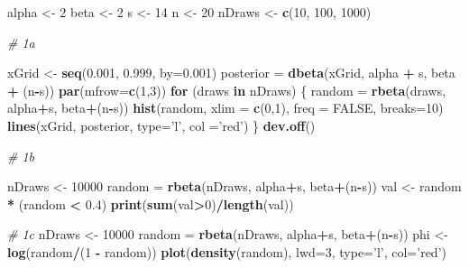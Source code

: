 \documentclass[]{article}
\newenvironment{Shaded}{\begin{snugshade}}{\end{snugshade}}
\newcommand{\KeywordTok}[1]{\textcolor[rgb]{0.13,0.29,0.53}{\textbf{#1}}}
\newcommand{\DataTypeTok}[1]{\textcolor[rgb]{0.13,0.29,0.53}{#1}}
\newcommand{\DecValTok}[1]{\textcolor[rgb]{0.00,0.00,0.81}{#1}}
\newcommand{\FloatTok}[1]{\textcolor[rgb]{0.00,0.00,0.81}{#1}}
\newcommand{\StringTok}[1]{\textcolor[rgb]{0.31,0.60,0.02}{#1}}
\newcommand{\CommentTok}[1]{\textcolor[rgb]{0.56,0.35,0.01}{\textit{#1}}}
\newcommand{\OtherTok}[1]{\textcolor[rgb]{0.56,0.35,0.01}{#1}}
\newcommand{\ControlFlowTok}[1]{\textcolor[rgb]{0.13,0.29,0.53}{\textbf{#1}}}
\newcommand{\OperatorTok}[1]{\textcolor[rgb]{0.81,0.36,0.00}{\textbf{#1}}}
\newcommand{\NormalTok}[1]{#1}
\begin{document}
\begin{Shaded}
\begin{Highlighting}[]
\NormalTok{alpha <-}\StringTok{ }\DecValTok{2}
\NormalTok{beta <-}\StringTok{ }\DecValTok{2}
\NormalTok{s <-}\StringTok{ }\DecValTok{14}
\NormalTok{n <-}\StringTok{ }\DecValTok{20}
\NormalTok{nDraws <-}\StringTok{ }\KeywordTok{c}\NormalTok{(}\DecValTok{10}\NormalTok{, }\DecValTok{100}\NormalTok{, }\DecValTok{1000}\NormalTok{)}

\CommentTok{# 1a}

\NormalTok{xGrid <-}\StringTok{ }\KeywordTok{seq}\NormalTok{(}\FloatTok{0.001}\NormalTok{, }\FloatTok{0.999}\NormalTok{, }\DataTypeTok{by=}\FloatTok{0.001}\NormalTok{)}
\NormalTok{posterior =}\StringTok{ }\KeywordTok{dbeta}\NormalTok{(xGrid, alpha }\OperatorTok{+}\StringTok{ }\NormalTok{s, beta }\OperatorTok{+}\StringTok{ }\NormalTok{(n}\OperatorTok{-}\NormalTok{s))}
\KeywordTok{par}\NormalTok{(}\DataTypeTok{mfrow=}\KeywordTok{c}\NormalTok{(}\DecValTok{1}\NormalTok{,}\DecValTok{3}\NormalTok{))}
\ControlFlowTok{for}\NormalTok{ (draws }\ControlFlowTok{in}\NormalTok{ nDraws) \{}
\NormalTok{  random =}\StringTok{ }\KeywordTok{rbeta}\NormalTok{(draws, alpha}\OperatorTok{+}\NormalTok{s, beta}\OperatorTok{+}\NormalTok{(n}\OperatorTok{-}\NormalTok{s))}
  \KeywordTok{hist}\NormalTok{(random, }\DataTypeTok{xlim =} \KeywordTok{c}\NormalTok{(}\DecValTok{0}\NormalTok{,}\DecValTok{1}\NormalTok{), }\DataTypeTok{freq =} \OtherTok{FALSE}\NormalTok{, }\DataTypeTok{breaks=}\DecValTok{10}\NormalTok{)}
  \KeywordTok{lines}\NormalTok{(xGrid, posterior, }\DataTypeTok{type=}\StringTok{'l'}\NormalTok{, }\DataTypeTok{col =}\StringTok{'red'}\NormalTok{)}
\NormalTok{\}}
\KeywordTok{dev.off}\NormalTok{() }

\CommentTok{# 1b}

\NormalTok{nDraws <-}\StringTok{ }\DecValTok{10000}
\NormalTok{random =}\StringTok{ }\KeywordTok{rbeta}\NormalTok{(nDraws, alpha}\OperatorTok{+}\NormalTok{s, beta}\OperatorTok{+}\NormalTok{(n}\OperatorTok{-}\NormalTok{s))}
\NormalTok{val <-}\StringTok{ }\NormalTok{random }\OperatorTok{*}\StringTok{ }\NormalTok{(random }\OperatorTok{<}\StringTok{ }\FloatTok{0.4}\NormalTok{)}
\KeywordTok{print}\NormalTok{(}\KeywordTok{sum}\NormalTok{(val}\OperatorTok{>}\DecValTok{0}\NormalTok{)}\OperatorTok{/}\KeywordTok{length}\NormalTok{(val))}

\CommentTok{# 1c}
\NormalTok{nDraws <-}\StringTok{ }\DecValTok{10000}
\NormalTok{random =}\StringTok{ }\KeywordTok{rbeta}\NormalTok{(nDraws, alpha}\OperatorTok{+}\NormalTok{s, beta}\OperatorTok{+}\NormalTok{(n}\OperatorTok{-}\NormalTok{s))}
\NormalTok{phi <-}\StringTok{ }\KeywordTok{log}\NormalTok{(random}\OperatorTok{/}\NormalTok{(}\DecValTok{1} \OperatorTok{-}\StringTok{ }\NormalTok{random))}
\KeywordTok{plot}\NormalTok{(}\KeywordTok{density}\NormalTok{(random), }\DataTypeTok{lwd=}\DecValTok{3}\NormalTok{, }\DataTypeTok{type=}\StringTok{'l'}\NormalTok{, }\DataTypeTok{col=}\StringTok{'red'}\NormalTok{)}
\end{Highlighting}
\end{Shaded}
\end{document}
